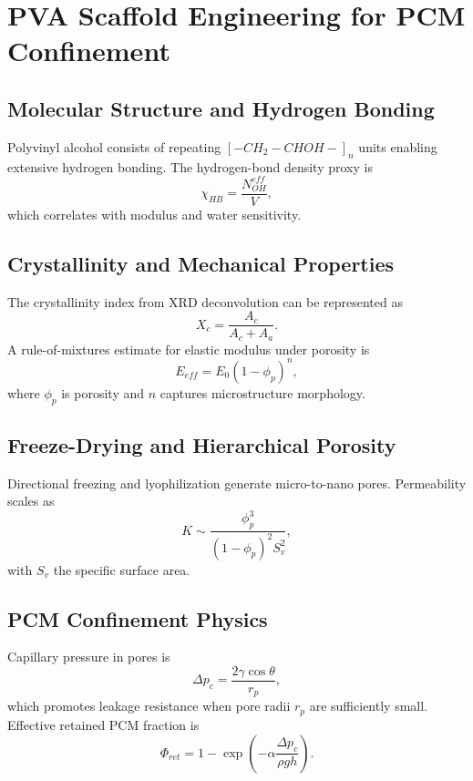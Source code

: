 \chapter{PVA Scaffold Engineering for PCM Confinement}\label{ch:pva}

\section{Molecular Structure and Hydrogen Bonding}
Polyvinyl alcohol consists of repeating $[-CH_2-CHOH-]_n$ units enabling extensive hydrogen bonding. The hydrogen-bond density proxy is
\begin{equation}\label{eq:hb_density}
\chi_{HB}=\frac{N_{OH}^{eff}}{V},
\end{equation}
which correlates with modulus and water sensitivity.

\section{Crystallinity and Mechanical Properties}
The crystallinity index from XRD deconvolution can be represented as
\begin{equation}\label{eq:crystallinity}
X_c=\frac{A_c}{A_c+A_a}.
\end{equation}
A rule-of-mixtures estimate for elastic modulus under porosity is
\begin{equation}\label{eq:modulus_porosity}
E_{eff}=E_0(1-\phi_p)^n,
\end{equation}
where $\phi_p$ is porosity and $n$ captures microstructure morphology.

\section{Freeze-Drying and Hierarchical Porosity}
Directional freezing and lyophilization generate micro-to-nano pores. Permeability scales as
\begin{equation}\label{eq:kozeny}
K\sim\frac{\phi_p^3}{(1-\phi_p)^2 S_v^2},
\end{equation}
with $S_v$ the specific surface area.

\section{PCM Confinement Physics}
Capillary pressure in pores is
\begin{equation}\label{eq:capillary}
\Delta p_c=\frac{2\gamma\cos\theta}{r_p},
\end{equation}
which promotes leakage resistance when pore radii $r_p$ are sufficiently small. Effective retained PCM fraction is
\begin{equation}\label{eq:retention}
\Phi_{ret}=1-\exp\left(-\alpha\frac{\Delta p_c}{\rho g h}\right).
\end{equation}

